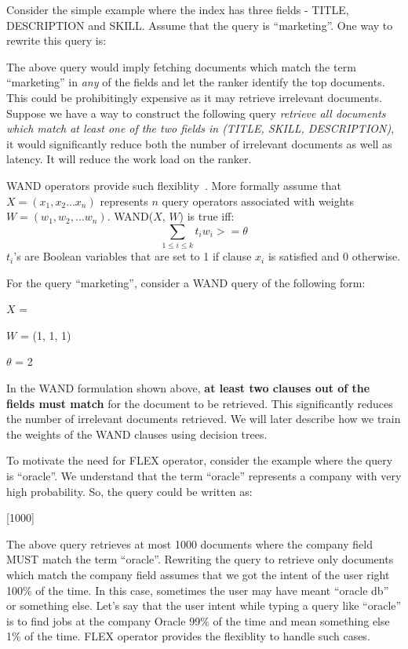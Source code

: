 Consider the simple example where the index has three fields - TITLE,
DESCRIPTION and SKILL. Assume that the query is ``marketing''. One way
to rewrite this query is:


The above query would imply fetching documents which match the term ``marketing'' in {\it
any} of the fields and let the ranker identify the top documents. This could be
prohibitingly expensive as it may retrieve irrelevant documents. Suppose we
have a way to construct the following query {\it retrieve all documents which
match at least one of the two fields in (TITLE, SKILL, DESCRIPTION)}, it would
significantly reduce both the number of irrelevant documents as well as
latency. It will reduce the work load on the ranker.

WAND operators provide such flexiblity~\cite{broder2003efficient}. More
formally assume that $ X = (x_1, x_2 \ldots x_n)$ represents $n$ query operators
associated with weights $ W = (w_1, w_2, \ldots w_n)$. WAND($X$, $W$)
is true iff:
\begin{equation}
    \sum_{1 \leq i \leq k} t_i w_i >= \theta
\label{eqn:wand}
\end{equation}
$t_i$'s are Boolean variables that are set to 1 if clause $x_i$ is satisfied
and 0 otherwise. 

For the query ``marketing'', consider a WAND query of the following form:

$X$ = 

$W$ = (1, 1, 1)

$\theta$ = 2


In the WAND formulation shown above, {\bf at least
two clauses out of the fields must match} for the document to be retrieved. This
significantly reduces the number of irrelevant documents retrieved.
We will later describe how we train the weights of the WAND clauses using
decision trees. 

To motivate the need for FLEX operator, consider the example where the query is
``oracle''. We understand that the term ``oracle'' represents a company with
very high probability. So, the query could be written as:

[1000]

The above query retrieves at most 1000 documents where the company field MUST
match the term ``oracle''. Rewriting the query to retrieve only documents which
match the company field assumes that we got the intent of the user right 100\%
of the time. In this case, sometimes the user may have meant ``oracle db'' or
something else. Let's say that the user intent while typing a query like
``oracle'' is to find jobs at the company Oracle 99\% of the time and mean
something else 1\% of the time. FLEX operator provides the flexiblity to handle
such cases. 

